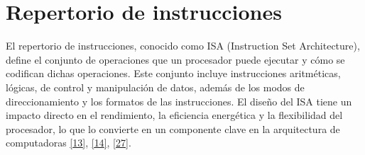 \documentclass[12pt,oneside]{templates/unerthesis}
\begin{document}
\begin{table}[!h]
\centering
\caption{\label{tab:comparq}Comparación de Arquitecturas}
\centering
{}
\end{table}

\hypertarget{repertorio-de-instrucciones}{%
\section{Repertorio de instrucciones}\label{repertorio-de-instrucciones}}

El repertorio de instrucciones, conocido como ISA (Instruction Set Architecture), define el conjunto de operaciones que un procesador puede ejecutar y cómo se codifican dichas operaciones. Este conjunto incluye instrucciones aritméticas, lógicas, de control y manipulación de datos, además de los modos de direccionamiento y los formatos de las instrucciones. El diseño del ISA tiene un impacto directo en el rendimiento, la eficiencia energética y la flexibilidad del procesador, lo que lo convierte en un componente clave en la arquitectura de computadoras \protect\hyperlink{ref-hennessy_computer_2012}{{[}13{]}}, \protect\hyperlink{ref-stallings_computer_2013}{{[}14{]}}, \protect\hyperlink{ref-null_essentials_2014}{{[}27{]}}.
\end{document}
